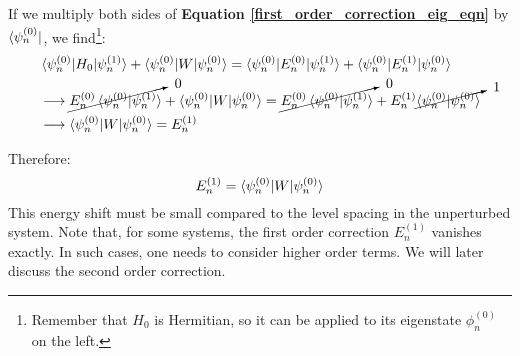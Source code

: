 If we multiply both sides of \textbf{Equation \ref{first_order_correction_eig_eqn}} by $\bra{\psi_n^{(0)}}$, we find\footnote{Remember that $H_0$ is Hermitian, so it can be applied to its eigenstate $\phi_n^{(0)}$ on the left.}:
\begin{equation}
    \begin{split}
        &\braket{\psi_n^{(0)}|H_0|\psi_n^{(1)}} + \braket{\psi_n^{(0)}|W|\psi_n^{(0)}} = \braket{\psi_n^{(0)}|E_n^{(0)}|\psi_n^{(1)}} + \braket{\psi_n^{(0)}|E_n^{(1)}|\psi_n^{(0)}}\\
        &\longrightarrow \cancelto{\ 0}{E_n^{(0)}\braket{\psi_n^{(0)}|\psi_n^{(1)}}} + \braket{\psi_n^{(0)}|W|\psi_n^{(0)}} = \cancelto{\ 0}{E_n^{(0)}\braket{\psi_n^{(0)}|\psi_n^{(1)}}} + E_n^{(1)}\cancelto{\ 1}{\braket{\psi_n^{(0)}|\psi_n^{(0)}}} \\
        &\longrightarrow \braket{\psi_n^{(0)}|W|\psi_n^{(0)}} = E_n^{(1)}
    \end{split}
\end{equation}

Therefore:
\begin{equation}
    E_n^{(1)} = \braket{\psi_n^{(0)}|W|\psi_n^{(0)}}
\end{equation}
This energy shift must be small compared to the level spacing in the unperturbed system. Note that, for some systems, the first order correction $E_n^{(1)}$ vanishes exactly. In such cases, one needs to consider higher order terms. We will later discuss the second order correction.

